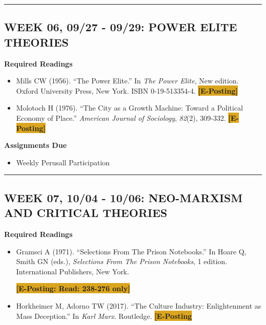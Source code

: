 \documentclass[11pt,]{article}
\providecommand{\tightlist}{%
  \setlength{\itemsep}{0pt}\setlength{\parskip}{0pt}}
\begin{document}
\bigbreak
\hrule

\hypertarget{week-06-0927---0929-power-elite-theories}{%
\subsection{WEEK 06, 09/27 - 09/29: POWER ELITE
THEORIES}\label{week-06-0927---0929-power-elite-theories}}

\textbf{Required Readings}

\begin{itemize}
\item
  Mills CW (1956). ``The Power Elite.'' In \emph{The Power Elite}, New
  edition. Oxford University Press, New York. ISBN 0-19-513354-4.
  \colorbox{Goldenrod}{\bf{[E-Posting]}}
\item
  Molotoch H (1976). ``The City as a Growth Machine: Toward a Political
  Economy of Place.'' \emph{American Journal of Sociology},
  \emph{82}(2), 309-332. \colorbox{Goldenrod}{\bf{[E-Posting]}}
\end{itemize}

\textbf{Assignments Due}

\begin{itemize}
\tightlist
\item
  Weekly Perusall Participation
\end{itemize}

\bigbreak
\hrule

\hypertarget{week-07-1004---1006-neo-marxism-and-critical-theories}{%
\subsection{WEEK 07, 10/04 - 10/06: NEO-MARXISM AND CRITICAL
THEORIES}\label{week-07-1004---1006-neo-marxism-and-critical-theories}}

\textbf{Required Readings}

\begin{itemize}
\item
  Gramsci A (1971). ``Selections From The Prison Notebooks.'' In Hoare
  Q, Smith GN (eds.), \emph{Selections From The Prison Notebooks}, 1
  edition. International Publishers, New York.

  \colorbox{Goldenrod}{\bf{[E-Posting: Read: 238-276 only]}}
\item
  Horkheimer M, Adorno TW (2017). ``The Culture Industry: Enlightenment
  as Mass Deception.'' In \emph{Karl Marx}. Routledge.
  \colorbox{Goldenrod}{\bf{[E-Posting}}
\end{itemize}
\end{document}
